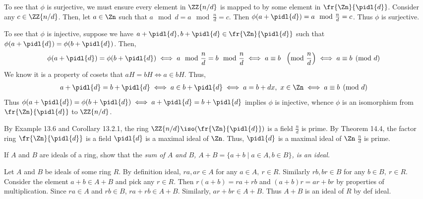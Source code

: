 \documentclass{article}
\begin{document}
\begin{solution}
\begin{enumerate}[label=\bd{\alph*.}]
\begin{subproof}[Claim 1]
\begin{subproof}[Claim 2]
        To see that \( \phi \) is surjective, we must ensure every element in \( \ZZ{n/d} \) is mapped to by some element in \( \fr{\Zn}{\pidl{d}} \).
        Consider any \( c\in\ZZ{n/d} \).
        Then, let \( a\in\Zn \) such that \( a\mod d = a\mod{\frac{n}{d}} = c \).
        Then \( \phi(a+\pidl{d}) = a\mod{\frac{n}{d}} = c \).
        Thus \( \phi \) is surjective.

        To see that \( \phi \) is injective, suppose we have \( a+\pidl{d}, b+\pidl{d}\in\fr{\Zn}{\pidl{d}} \) such that \( \phi(a+\pidl{d}) = \phi(b+\pidl{d}) \).
        Then, \begin{align*}
          \phi(a+\pidl{d}) = \phi(b+\pidl{d}) &\iff a\mod{\frac{n}{d}} = b\mod{\frac{n}{d}} \iff a \equiv b\ \,\, \left(\text{mod }\frac{n}{d}\right) \iff a \equiv b\pmod d
        \end{align*}
        We know it is a property of cosets that \( aH=bH \iff a\in bH \).
        Thus, \begin{align*}
          a+\pidl{d} = b+\pidl{d} &\iff a\in b+\pidl{d} \iff a = b+dx,\ x\in\Zn \iff a\equiv b\pmod d
        \end{align*}
        Thus \( \phi(a+\pidl{d}) = \phi(b+\pidl{d})\iff a+\pidl{d}=b+\pidl{d} \) implies \( \phi \) is injective, whence \( \phi \) is an isomorphism from \( \fr{\Zn}{\pidl{d}} \) to \( \ZZ{n/d} \).
      \end{subproof}
      By Example 13.6 and Corollary 13.2.1, the ring \( \ZZ{n/d}\iso (\fr{\Zn}{\pidl{d}}) \) is a field \iff \( \frac{n}{d} \) is prime.
      By Theorem 14.4, the factor ring \( \fr{\Zn}{\pidl{d}} \) is a field \iff \( \pidl{d} \) is a maximal ideal of \( \Zn \).
      Thus, \( \pidl{d} \) is a maximal ideal of \( \Zn \) \iff \( \frac{n}{d} \) is prime.
    \end{subproof}
\end{enumerate}
\end{solution}
\pagebreak

If \( A \) and \( B \) are ideals of a ring, show that the \it{sum} of \( A \) and \( B \), \( A+B = \{a+b\mid a\in A,b\in B\} \), is an ideal.

\begin{solution} %
  Let \( A \) and \( B \) be ideals of some ring \( R \). By definition ideal, \( ra,ar\in A \) for any \( a\in A,\ r\in R \). Similarly \( rb,br\in B \) for any \( b\in B,\ r\in R \). Consider the element \( a+b\in A+B \) and pick any \( r\in R \). Then \( r(a+b) = ra+rb \) and \( (a+b)r = ar+br \) by properties of multiplication. Since \( ra\in A \) and \( rb\in B \), \( ra+rb \in A+B \). Similarly, \( ar+br \in A+B \). Thus \( A+B \) is an ideal of \( R \) by def ideal.
\end{solution}
\end{document}
